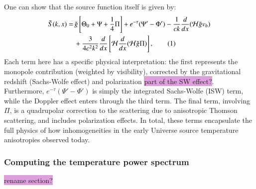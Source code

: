 \documentclass{aa}
\newcommand\numberthis{\addtocounter{equation}{1}\tag{\theequation}}
\numberwithin{equation}{section}
\numberwithin{table}{section}
\numberwithin{figure}{section}
\begin{document}
One can show that the source function itself is given by:
\begin{align*}
\tilde{S}(k, x) =\, &\tilde{g} \left[ \Theta_0 + \Psi + \frac{1}{4} \Pi \right] + e^{-\tau} (\Psi' - \Phi') - \frac{1}{ck} \frac{d}{dx}(\mathcal{H} \tilde{g} v_b) \\
&+ \frac{3}{4 c^2 k^2} \frac{d}{dx} \left[ \mathcal{H} \frac{d}{dx} (\mathcal{H} \tilde{g} \Pi) \right], \numberthis
\end{align*}
Each term here has a specific physical interpretation: the first represents the monopole contribution (weighted by visibility), corrected by the gravitational redshift (Sachs-Wolfe effect) and polarization \colorbox{Plum}{part of the SW effect?}. Furthermore, $e^{-\tau}(\Psi' - \Phi')$ is simply the integrated Sachs-Wolfe (ISW) term, while the Doppler effect enters through the third term. The final term, involving $\Pi$, is a quadrupolar correction to the scattering due to anisotropic Thomson scattering, and includes polarization effects. In total, these terms encapsulate the full physics of how inhomogeneities in the early Universe source temperature anisotropies observed today. 





\subsubsection{Computing the temperature power spectrum}\label{subsubsec: IV theory CMB}
\colorbox{Plum}{rename section?}
\end{document}
